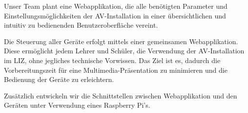 Unser Team plant eine Webapplikation, die alle benötigten Parameter und
Einstellungsmöglichkeiten der AV-Installation in einer übersichtlichen
und intuitiv zu bedienenden Benutzeroberfläche vereint.

Die Steuerung aller Geräte erfolgt mittels einer gemeinsamen
Webapplikation. Diese ermöglicht jedem Lehrer und Schüler, die
Verwendung der AV-Installation im LIZ, ohne jegliches technische
Vorwissen. Das Ziel ist es, dadurch die Vorbereitungszeit für eine
Multimedia-Präsentation zu minimieren und die Bedienung der Geräte zu
erleichtern.

Zusätzlich entwickeln wir die Schnittstellen zwischen Webapplikation und
den Geräten unter Verwendung eines Raspberry Pi's.
